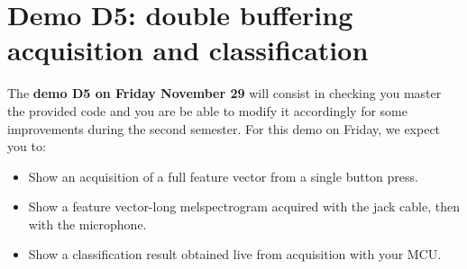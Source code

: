 \section{Demo D5: double buffering acquisition and classification}
%

The \textbf{demo D5 on Friday November 29} will consist in checking you master the provided code and you are be able to modify it accordingly for some improvements during the second semester. For this demo on Friday, we expect you to:
%
\begin{itemize}
    \item Show an acquisition of a full feature vector from a single button press.
    \item Show a feature vector-long melspectrogram acquired with the jack cable, then with the microphone.
    \item Show a classification result obtained live from acquisition with your MCU.
\end{itemize}
